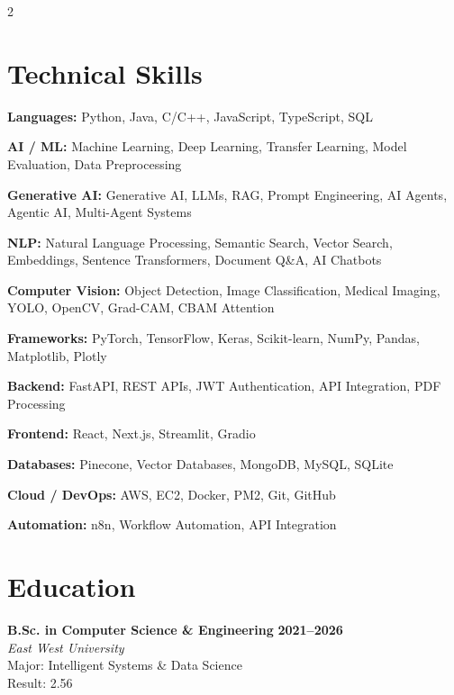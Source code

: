 \documentclass[10pt,a4paper]{article}
\newcommand{\skill}[2]{
    \textbf{#1:} #2
    \par\vspace{1.2mm}
}
\begin{document}
\begin{multicols}{2}


\section{Technical Skills}

\skill{Languages}{
Python, Java, C/C++, JavaScript, TypeScript, SQL
}

\skill{AI / ML}{
Machine Learning, Deep Learning, Transfer Learning,
Model Evaluation, Data Preprocessing
}

\skill{Generative AI}{
Generative AI, LLMs, RAG, Prompt Engineering,
AI Agents, Agentic AI, Multi-Agent Systems
}

\skill{NLP}{
Natural Language Processing, Semantic Search,
Vector Search, Embeddings, Sentence Transformers,
Document Q\&A, AI Chatbots
}

\skill{Computer Vision}{
Object Detection, Image Classification,
Medical Imaging, YOLO, OpenCV,
Grad-CAM, CBAM Attention
}

\skill{Frameworks}{
PyTorch, TensorFlow, Keras, Scikit-learn,
NumPy, Pandas, Matplotlib, Plotly
}

\skill{Backend}{
FastAPI, REST APIs, JWT Authentication,
API Integration, PDF Processing
}

\skill{Frontend}{
React, Next.js, Streamlit, Gradio
}

\skill{Databases}{
Pinecone, Vector Databases, MongoDB,
MySQL, SQLite
}

\skill{Cloud / DevOps}{
AWS, EC2, Docker, PM2, Git, GitHub
}

\skill{Automation}{
n8n, Workflow Automation, API Integration
}


\section*{Education}
\noindent
\textbf{B.Sc. in Computer Science \& Engineering} \hfill \textbf{2021--2026} \\
\textit{East West University} \\[1mm]
\small
Major: Intelligent Systems \& Data Science \\
Result: 2.56
\normalsize


\end{multicols}
\end{document}

